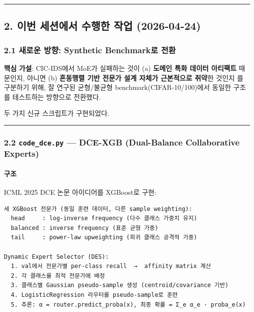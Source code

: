 \medskip\hrule\medskip
\subsection{2. 이번 세션에서 수행한 작업 (2026-04-24)}
\subsubsection{2.1 새로운 방향: Synthetic Benchmark로 전환}
\textbf{핵심 가설}: CIC-IDS에서 MoE가 실패하는 것이 (a) \textbf{도메인 특화 데이터 아티팩트} 때문인지, 아니면 (b) \textbf{혼동행렬 기반 전문가 설계 자체가 근본적으로 취약}한 것인지 를 구분하기 위해, 잘 연구된 균형/\allowbreak{}불균형 benchmark(CIFAR-10/\allowbreak{}100)에서 동일한 구조를 테스트하는 방향으로 전환했다.

두 가지 신규 스크립트가 구현되었다.


\medskip\hrule\medskip
\subsubsection{2.2 \texttt{code\_\allowbreak{}\allowbreak{}dce\allowbreak{}.\allowbreak{}py} — DCE-XGB (Dual-Balance Collaborative Experts)}
\paragraph{구조}
ICML 2025 DCE 논문 아이디어를 XGBoost로 구현:


\begin{Verbatim}[breaklines=true,breakanywhere=true,fontsize=\scriptsize]
세 XGBoost 전문가 (동일 훈련 데이터, 다른 sample weighting):
  head     : log-inverse frequency (다수 클래스 가중치 유지)
  balanced : inverse frequency (표준 균형 가중)
  tail     : power-law upweighting (희귀 클래스 공격적 가중)

Dynamic Expert Selector (DES):
  1. val에서 전문가별 per-class recall  →  affinity matrix 계산
  2. 각 클래스를 최적 전문가에 배정
  3. 클래스별 Gaussian pseudo-sample 생성 (centroid/covariance 기반)
  4. LogisticRegression 라우터를 pseudo-sample로 훈련
  5. 추론: α = router.predict_proba(x), 최종 확률 = Σ_e α_e · proba_e(x)

\end{Verbatim}
